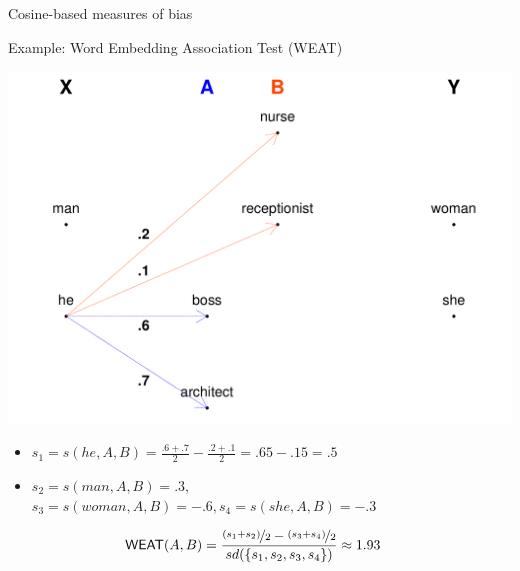 \documentclass[
  10pt,
  ignorenonframetext,
  x11names, dvipsnames, bibspacing,natbib]{beamer}
\begin{document}
\begin{frame}{Cosine-based measures of bias}
\protect\hypertarget{cosine-based-measures-of-bias-4}{}
\begin{block}{Example: Word Embedding Association Test (WEAT)}
\protect\hypertarget{example-word-embedding-association-test-weat}{}
\vspace{1mm}
\footnotesize

\begin{center}\includegraphics[width=0.55\linewidth]{presentationBoston_files/figure-beamer/unnamed-chunk-2-1} \end{center}
\normalsize

\pause

\footnotesize

\begin{itemize}
\item
  \(s_1 = s(he,A,B) = \frac{.6+.7}{2} - \frac{.2+.1}{2} = .65-.15= .5\)
\item
  \(s_2 = s(man,A,B) = .3\),
  \linebreak  \(s_3 = s(woman,A,B) = -.6, s_4 = s(she, A, B) = -.3\)
\end{itemize}

\vspace{-4mm}

\normalsize

\begin{align*}
\mathsf{WEAT}(A,B) & = \frac{\nicefrac{(s_1+s_2)}{2} - \nicefrac{(s_3+s_4)}{2}}{sd(\{s_1,s_2,s_3,s_4\})} \approx 1.93
\end{align*}
\end{block}
\end{frame}
\end{document}
